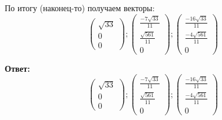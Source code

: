 \documentclass[a4paper,12pt]{article}
\begin{document}
По итогу (наконец-то) получаем векторы:
\[
\begin{pmatrix}
\sqrt{33} \\ 0 \\ 0
\end{pmatrix}
;
\begin{pmatrix}
 \frac{-7\sqrt{33}}{11} \\ \frac{\sqrt{561}}{11} \\ 0 
\end{pmatrix}
;
\begin{pmatrix}
\frac{-16\sqrt{33}}{11}  
\\
\frac{-4\sqrt{561}}{11}
\\
0
\end{pmatrix}
\]
\clearpage
\begin{center}
\textbf{Ответ: } 
\[
\begin{pmatrix}
\sqrt{33} \\ 0 \\ 0
\end{pmatrix}
;
\begin{pmatrix}
 \frac{-7\sqrt{33}}{11} \\ \frac{\sqrt{561}}{11} \\ 0 
\end{pmatrix}
;
\begin{pmatrix}
\frac{-16\sqrt{33}}{11}  
\\
\frac{-4\sqrt{561}}{11}
\\
0
\end{pmatrix}
\]
\end{center}
\end{document}
